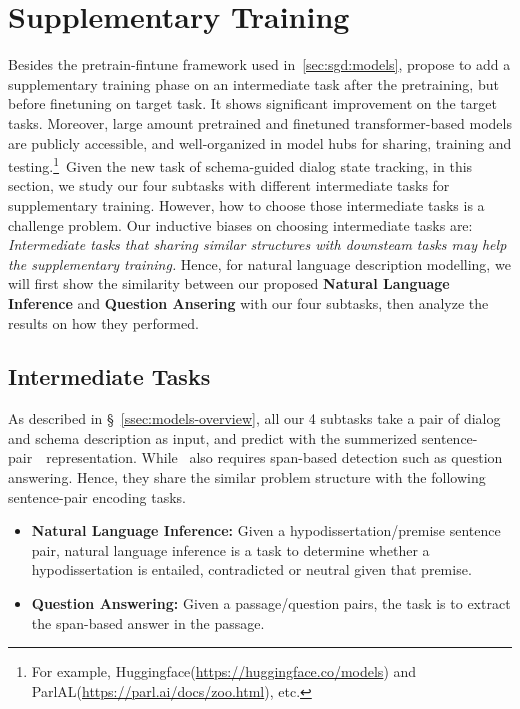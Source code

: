 \section{Supplementary Training}
\label{sec:sgd:sup-training}
Besides the pretrain-fintune framework used in~\autoref{sec:sgd:models},
\citet{phang2018sentence} propose to add a supplementary training
phase on an intermediate task after the pretraining, but before
finetuning on target task. It shows significant improvement on the
target tasks. Moreover, large amount pretrained and finetuned
transformer-based models are publicly accessible, and well-organized
in model hubs for sharing, training and testing.\footnote{For example,
  Huggingface(\url{https://huggingface.co/models}) and
  ParlAL(\url{https://parl.ai/docs/zoo.html}), etc.}~Given the new
task of schema-guided dialog state tracking, in this section, we study
our four subtasks with different intermediate tasks for supplementary
training. However, how to choose those intermediate tasks is a
challenge problem. Our inductive biases on choosing intermediate tasks
are: \textit{Intermediate tasks that sharing similar structures with
  downsteam tasks may help the supplementary training.}  Hence, for
natural language description modelling, we will first show the
similarity between our proposed \textbf{Natural Language Inference}
and \textbf{Question Ansering} with our four subtasks, then analyze
the results on how they performed.

\subsection{Intermediate Tasks}
\label{ssec:intermediate-tasks}
As described in \S~\ref{ssec:models-overview}, all our 4
subtasks take a pair of dialog and schema description as input, and
predict with the summerized sentence-pair~\CLS~representation. While
\NSL~also requires span-based detection such as question
answering. Hence, they share the similar problem structure with the
following sentence-pair encoding tasks.
\begin{itemize}
\item \textbf{Natural Language Inference:} Given a hypodissertation/premise
sentence pair, natural language inference is a task to determine
whether a hypodissertation is entailed, contradicted or neutral given
that premise.

\item \textbf{Question Answering:} Given a passage/question pairs, the
task is to extract the span-based answer in the passage.
\end{itemize}


